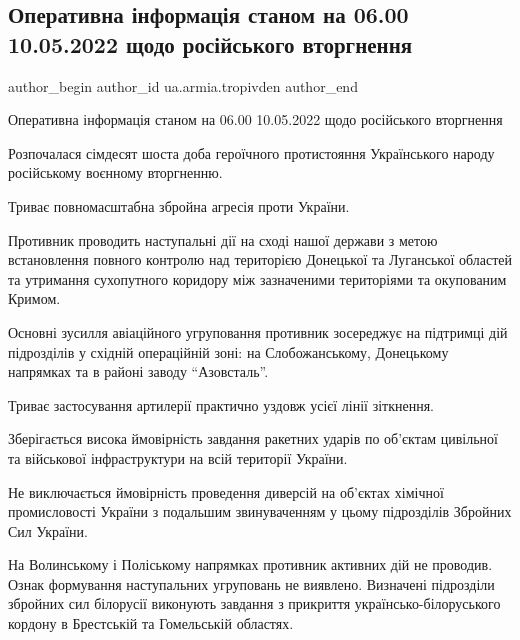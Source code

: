  
 
 
 
 
 
\subsection{Оперативна інформація станом на 06.00 10.05.2022 щодо російського вторгнення}
\label{sec:10_05_2022.fb.ua.armia.tropivden.1.operatyvna_informacia}
 
\ifcmt
 author_begin
   author_id ua.armia.tropivden
 author_end
\fi

Оперативна інформація станом на 06.00 10.05.2022 щодо російського вторгнення

Розпочалася сімдесят шоста доба героїчного протистояння Українського народу
російському воєнному вторгненню.

Триває повномасштабна збройна агресія проти України. 


Противник проводить наступальні дії на сході нашої держави з метою встановлення
повного контролю над територією Донецької та Луганської областей та утримання
сухопутного коридору між зазначеними територіями та окупованим Кримом. 

Основні зусилля авіаційного угруповання противник зосереджує на підтримці дій
підрозділів у східній операційній зоні: на Слобожанському, Донецькому напрямках
та в районі заводу \enquote{Азовсталь}.

Триває застосування артилерії практично уздовж усієї лінії зіткнення.

Зберігається висока ймовірність завдання ракетних ударів по об’єктам цивільної
та військової інфраструктури на всій території України.

Не виключається ймовірність проведення диверсій на об'єктах хімічної
промисловості України з подальшим звинуваченням у цьому підрозділів Збройних
Сил України.

На Волинському і Поліському напрямках противник активних дій не проводив. Ознак
формування наступальних угруповань не виявлено. Визначені підрозділи збройних
сил білорусії виконують завдання з прикриття українсько-білоруського кордону в
Брестській та Гомельській областях.

